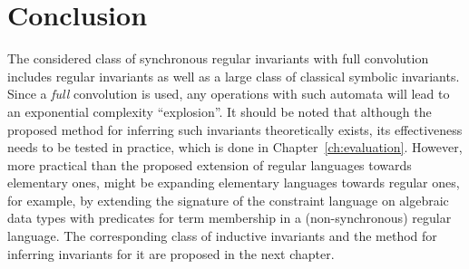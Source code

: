 \section{Conclusion}
The considered class of synchronous regular invariants with full convolution includes regular invariants as well as a large class of classical symbolic invariants. Since a \emph{full} convolution is used, any operations with such automata will lead to an exponential complexity ``explosion''. It should be noted that although the proposed method for inferring such invariants theoretically exists, its effectiveness needs to be tested in practice, which is done in Chapter~\cref{ch:evaluation}. However, more practical than the proposed extension of regular languages towards elementary ones, might be expanding elementary languages towards regular ones, for example, by extending the signature of the constraint language on algebraic data types with predicates for term membership in a (non-synchronous) regular language. The corresponding class of inductive invariants and the method for inferring invariants for it are proposed in the next chapter.
